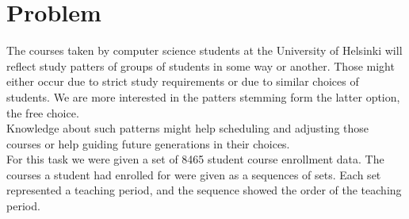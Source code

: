 \section{Problem}

The courses taken by computer science students at the University of Helsinki will reflect study patters of groups of students in some way or another. Those might either occur due to strict study requirements or due to similar choices of students. We are more interested in the patters stemming form the latter option, the free choice.\\

Knowledge about such patterns might help scheduling and adjusting those courses or help guiding future generations in their choices.\\

For this task we were given a set of 8465 student course enrollment data. The courses a student had enrolled for were given as a sequences of sets. Each set represented a teaching period, and the sequence showed the order of the teaching period.

